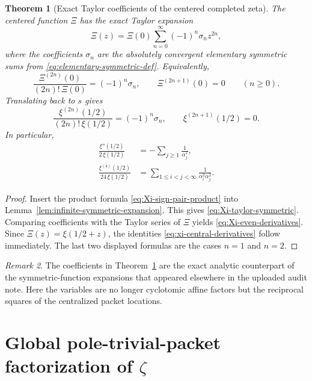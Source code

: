\documentclass[11pt,a4paper]{article}
\numberwithin{equation}{section}
\newtheorem{theorem}{Theorem}[section]
\theoremstyle{definition}
\theoremstyle{remark}
\newtheorem{remark}[theorem]{Remark}
\begin{document}
\begin{theorem}[Exact Taylor coefficients of the centered completed zeta]\label{thm:Xi-taylor-coefficients}
The centered function $\Xi$ has the exact Taylor expansion
\begin{equation}\label{eq:Xi-taylor-symmetric}
\Xi(z)=\Xi(0)\sum_{n=0}^{\infty}(-1)^n\sigma_n z^{2n},
\end{equation}
where the coefficients $\sigma_n$ are the absolutely convergent elementary symmetric sums from \eqref{eq:elementary-symmetric-def}.  Equivalently,
\begin{equation}\label{eq:Xi-even-derivatives}
\frac{\Xi^{(2n)}(0)}{(2n)!\,\Xi(0)}=(-1)^n\sigma_n,
\qquad
\Xi^{(2n+1)}(0)=0
\qquad (n\ge 0).
\end{equation}
Translating back to $s$ gives
\begin{equation}\label{eq:xi-central-derivatives}
\frac{\xi^{(2n)}(1/2)}{(2n)!\,\xi(1/2)}=(-1)^n\sigma_n,
\qquad
\xi^{(2n+1)}(1/2)=0.
\end{equation}
In particular,
\begin{align}
\frac{\xi''(1/2)}{2\,\xi(1/2)}&=-\sum_{j\ge 1}\frac{1}{\alpha_j^2},\label{eq:xi-second-derivative}\\
\frac{\xi^{(4)}(1/2)}{24\,\xi(1/2)}&=\sum_{1\le i<j<\infty}\frac{1}{\alpha_i^2\alpha_j^2}.\label{eq:xi-fourth-derivative}
\end{align}
\end{theorem}

\begin{proof}
Insert the product formula \eqref{eq:Xi-sign-pair-product} into Lemma~\ref{lem:infinite-symmetric-expansion}.  This gives \eqref{eq:Xi-taylor-symmetric}.  Comparing coefficients with the Taylor series of $\Xi$ yields \eqref{eq:Xi-even-derivatives}.  Since $\Xi(z)=\xi(1/2+z)$, the identities \eqref{eq:xi-central-derivatives} follow immediately.  The last two displayed formulas are the cases $n=1$ and $n=2$.
\end{proof}

\begin{remark}
The coefficients in Theorem~\ref{thm:Xi-taylor-coefficients} are the exact analytic counterpart of the symmetric-function expansions that appeared elsewhere in the uploaded audit note.  Here the variables are no longer cyclotomic affine factors but the reciprocal squares of the centralized packet locations.
\end{remark}

\section{Global pole-trivial-packet factorization of $\zeta$}
\end{document}
